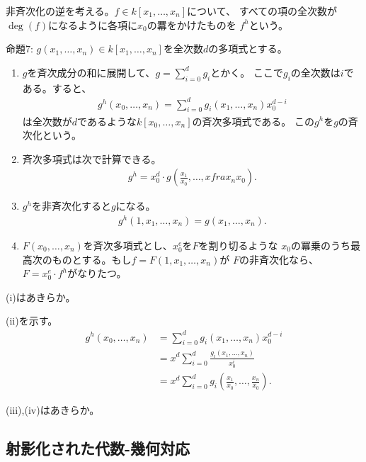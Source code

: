 非斉次化の逆を考える。$f\in k[x_1,\dots,x_n]$について、
すべての項の全次数が$\deg(f)$になるように各項に$x_0$の羃をかけたものを
$f^h$という。

\begin{framed}
  命題7:
  $g(x_1,\dots,x_n) \in k[x_1,\dots,x_n]$を全次数$d$の多項式とする。
  \begin{enumerate}[label=(\roman*)]
    \item
    $g$を斉次成分の和に展開して、$g=\sum_{i=0}^d g_i$とかく。
    ここで$g_i$の全次数は$i$である。すると、
    \begin{align}
      g^h(x_0,\dots,x_n)
      =
      \sum_{i=0}^d g_i(x_1,\dots,x_n) x_0^{d-i}
    \end{align}
    は全次数が$d$であるような$k[x_0,\dots,x_n]$の斉次多項式である。
    この$g^h$を$g$の斉次化という。
    \item
    斉次多項式は次で計算できる。
    \begin{align}
      g^h = x_0^d\cdot g(\frac{x_1}{x_0},\dots,xfra x_n x_0).
    \end{align}
    \item
    $g^h$を非斉次化すると$g$になる。
    \begin{align}
      g^h(1,x_1,\dots,x_n)  = g(x_1,\dots,x_n).
    \end{align}
    \item
    $F(x_0,\dots,x_n)$を斉次多項式とし、$x_0^e$を$F$を割り切るような
    $x_0$の冪乗のうち最高次のものとする。もし$f=F(1,x_1,\dots,x_n)$が
    $F$の非斉次化なら、$F=x_0^e\cdot f^h$がなりたつ。
  \end{enumerate}
\end{framed}
\begin{myproof}
  (i)はあきらか。

  (ii)を示す。
  \begin{align}
    g^h(x_0,\dots,x_n) &=
    \sum_{i=0}^d g_i(x_1,\dots,x_n)x_0^{d-i}\\
    &=
    x^d \sum_{i=0}^d \frac{g_i(x_1,\dots,x_n)}{x_0^i} \\
    &=
    x^d \sum_{i=0}^d g_i(\frac{x_1}{x_0},\dots,\frac{x_n}{x_0}) .
  \end{align}

  (iii),(iv)はあきらか。
\end{myproof}

\subsection{射影化された代数-幾何対応}
\label{sub:射影化された代数-幾何対応}

